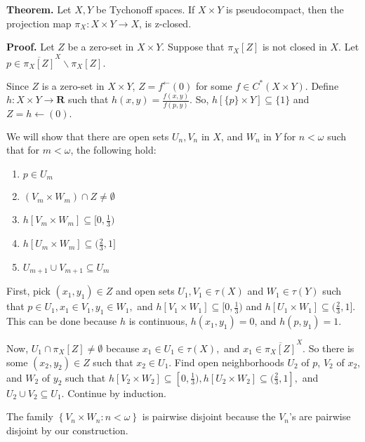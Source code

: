 \documentclass{article}
\begin{document}
\textbf{Theorem.} Let $X, Y$ be Tychonoff spaces. If $X\times Y$ is pseudocompact, then the projection map $\pi_X: X\times Y\rightarrow X$, is z-closed. 

\vskip 20pt

\textbf{Proof.} Let $Z$ be a zero-set in $X\times Y$. Suppose that $\pi_X[Z]$ is not closed in $X$. Let $p\in \overline{\pi_X[Z]}^X\backslash \pi_X[Z].$ 

\vskip 15pt

Since $Z$ is a zero-set in $X\times Y$, $Z=f^\leftarrow (0)$ for some $f\in C^*(X\times Y).$ Define $h: X\times Y\rightarrow \textbf{R}$ such that $h(x,y)=\frac{f(x,y)}{f(p,y)}$. So, $h\left[\{p\}\times Y\right] \subseteq \{1\}$ and $Z=h\leftarrow (0).$ 
\vskip 10pt

We will show that there are open sets $U_n, V_n$ in $X$, and $W_n$ in $Y$ for $n<\omega$ such that for $m<\omega$, the following hold: 

\begin{enumerate}
	\item $p\in U_m$
	\item $(V_m\times W_m)\cap Z \neq \emptyset$
	\item $h\left[V_m\times W_m\right] \subseteq [0,\frac{1}{3})$
	\item $h\left[U_m\times W_m\right] \subseteq (\frac{2}{3},1]$
	\item $U_{m+1}\cup V_{m+1}\subseteq U_m$
\end{enumerate}

\vskip 5pt

First, pick $(x_1,y_1)\in Z$ and open sets $U_1,V_1\in \tau(X)$ and $W_1\in \tau(Y)$ such that $p\in U_1, x_1\in V_1, y_1\in W_1,$ and $h\left[V_1\times W_1\right] \subseteq [0,\frac{1}{3})$ and $h\left[U_1\times W_1\right] \subseteq (\frac{2}{3}, 1]$. This can be done because $h$ is continuous, $h(x_1,y_1)=0$, and $h(p,y_1)=1$.

\vskip 10pt

Now, $U_1\cap \pi_X[Z]\neq \emptyset$ because $x_1\in U_1\in \tau(X), $ and $x_1\in \overline{\pi_X[Z]}^X.$ So there is some $(x_2,y_2)\in Z$ such that $x_2\in U_1$. Find open neighborhoods $U_2$ of $p$, $V_2$ of $x_2$, and $W_2$ of $y_2$ such that $h\left[V_2\times W_2\right] \subseteq [0,\frac{1}{3}), h\left[U_2\times W_2\right]\subseteq (\frac{2}{3},1],$ and $U_2\cup V_2\subseteq U_1$. Continue by induction. 


\vskip 20pt
The family $\left\{V_n\times W_n: n<\omega\right\}$ is pairwise disjoint because the $V_n$'s are pairwise disjoint by our construction. 
\end{document}
